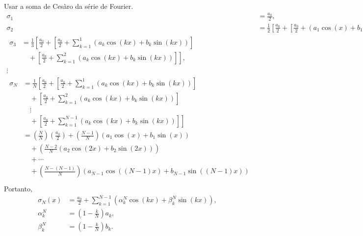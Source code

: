 \begin{obs}
    Usar a soma de Ces\`{a}ro da s\'{e}rie de Fourier.
    \begin{align*}
        \sigma_1 &= \frac{a_0}{2}, \\
        \sigma_2 &= \frac{1}{2} \left[ \frac{a_0}{2} + \left[ \frac{a_0}{2} + \left( a_1 \cos\left( x \right) + b_1 \sin\left( x \right) \right) \right] \right], \\
        \begin{split}
            \sigma_3 &= \frac{1}{3} \left[ \frac{a_0}{2} + \left[ \frac{a_0}{2} + \sum_{k = 1}^1 \left( a_k \cos\left( k x \right) + b_k \sin\left( k x \right) \right) \right] \right. \\
            &\quad \left. {}+ \left[ \frac{a_0}{2} + \sum_{k = 1}^2 \left( a_k \cos\left( k x \right) + b_k \sin\left( k x \right) \right) \right] \right],
        \end{split} \\
        \vdots \\
        \begin{split}
            \sigma_N &= \frac{1}{N} \left[ \frac{a_0}{2} + \left[ \frac{a_0}{2} + \sum_{k = 1}^1 \left( a_k \cos\left( k x \right) + b_k \sin\left( k x \right) \right) \right] \right. \\
            &\quad {}+ \left[ \frac{a_0}{2} + \sum_{k = 1}^2 \left( a_k \cos\left( k x \right) + b_k \sin\left( k x \right) \right) \right] \\
            &\quad \vdots \\
            &\quad \left. {}+ \left[ \frac{a_0}{2} + \sum_{k = 1}^{N - 1} \left( a_k \cos\left( k x \right) + b_k \sin\left( k x \right) \right) \right]\right] \\
            &= \left( \frac{N}{N} \right) \left( \frac{a_0}{2} \right) + \left( \frac{N - 1}{N} \right) \left( a_1 \cos\left( x \right) + b_1 \sin\left( x \right) \right) \\
            &\quad {}+ \left( \frac{N - 2}{N} \left( a_2 \cos\left( 2 x \right) + b_2 \sin\left( 2 x \right) \right) \right) \\
            &\quad {}+ \cdots \\
            &\quad {}+ \left( \frac{N - \left( N - 1 \right)}{N} \right) \left( a_{N - 1} \cos\left( \left( N - 1 \right) x \right) + b_{N - 1} \sin\left( \left( N - 1 \right) x \right) \right) \\
        \end{split}
    \end{align*}
    Portanto,
    \begin{align*}
        \sigma_N(x) &= \frac{a_0}{2} + \sum_{k = 1}^{N - 1} \left( \alpha_k^N \cos\left( k x \right) + \beta_k^N \sin\left( k x \right) \right), \\
        \alpha_k^N &= \left( 1 - \frac{k}{N} \right) a_k, \\
        \beta_k^N &= \left( 1 - \frac{k}{N} \right) b_k.
    \end{align*}


\end{obs}
